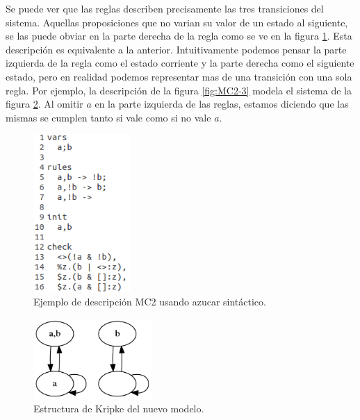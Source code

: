 Se puede ver que las reglas describen precisamente las tres transiciones del sistema. Aquellas proposiciones que no varian su valor de un estado al siguiente, se las puede obviar en la parte derecha de la regla como se ve en la figura \ref{fig:MC2-2}. Esta descripción es equivalente a la anterior. Intuitivamente podemos pensar la parte izquierda de la regla como el estado corriente y la parte derecha como el siguiente estado, pero en realidad podemos representar mas de una transición con una sola regla. Por ejemplo, la descripción de la figura \ref{fig:MC2-3} modela el sistema de la figura \ref{fig:kripke5}. Al omitir $a$ en la parte izquierda de las reglas, estamos diciendo que las mismas se cumplen tanto si vale como si no vale $a$.

\begin{figure}[H]
  \centering
  \includegraphics[width=0.33\textwidth]{Figures/modeloMC2-2.png}
  \caption{Ejemplo de descripción MC2 usando azucar sintáctico.}
  \label{fig:MC2-2}
\end{figure}

\begin{figure}[H]
  \centering
  \includegraphics[width=0.4\textwidth]{Figures/kripke5.png}
  \caption{Estructura de Kripke del nuevo modelo.}
  \label{fig:kripke5}
\end{figure}

